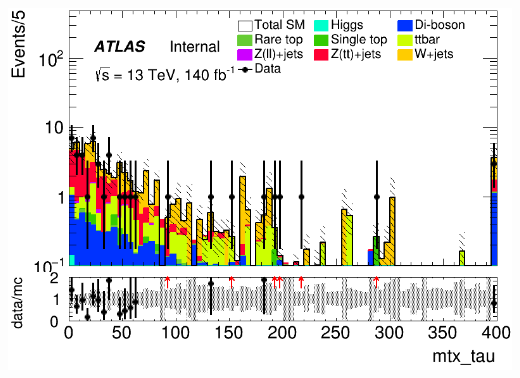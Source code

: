 \documentclass[usenames,dvipsnames]{beamer}
\begin{document}
\begin{frame}
\begin{minipage}{0.32\textwidth}
        \includegraphics[width=\textwidth]{graphics/HHH_met/HHH_met_mtx_tau.png}
    \end{minipage}
\end{frame}
\end{document}

